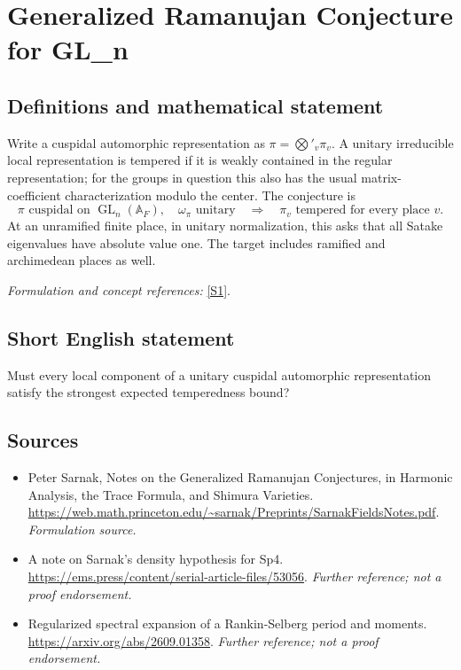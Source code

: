 \documentclass[11pt]{article}
\begin{document}
\section*{\texorpdfstring{Generalized Ramanujan Conjecture for GL\_n}{Generalized Ramanujan Conjecture for GL\_n}}\label{30}
\subsection{Definitions and mathematical statement}
Write a cuspidal automorphic representation as $\pi=\bigotimes'_v\pi_v$. A unitary irreducible local representation is tempered if it is weakly contained in the regular representation; for the groups in question this also has the usual matrix-coefficient characterization modulo the center. The conjecture is
\[
 \pi\text{ cuspidal on }\operatorname{GL}_n({\mathbb{A}}_F),\quad
 \omega_\pi\text{ unitary}\quad\Longrightarrow\quad
 \pi_v\text{ tempered for every place }v.
\]
At an unramified finite place, in unitary normalization, this asks that all Satake eigenvalues have absolute value one. The target includes ramified and archimedean places as well.
\par\smallskip\textit{Formulation and concept references:} \href{https://web.math.princeton.edu/~sarnak/Preprints/SarnakFieldsNotes.pdf}{[S1]}.

\subsection{Short English statement}
Must every local component of a unitary cuspidal automorphic representation satisfy the strongest expected temperedness bound?
\subsection{Sources}
\begin{itemize}
\item[S1]Peter Sarnak, Notes on the Generalized Ramanujan Conjectures, in Harmonic Analysis, the Trace Formula, and Shimura Varieties.
\url{https://web.math.princeton.edu/~sarnak/Preprints/SarnakFieldsNotes.pdf}.
\textit{Formulation source.}
\item[S2]A note on Sarnak's density hypothesis for Sp4.
\url{https://ems.press/content/serial-article-files/53056}.
\textit{Further reference; not a proof endorsement.}
\item[S3]Regularized spectral expansion of a Rankin-Selberg period and moments.
\url{https://arxiv.org/abs/2609.01358}.
\textit{Further reference; not a proof endorsement.}
\end{itemize}
\end{document}
